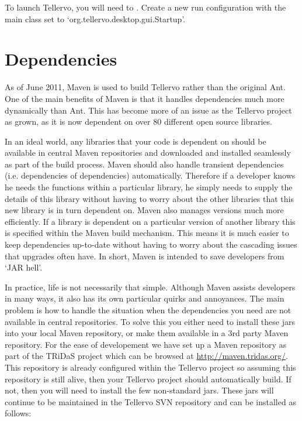 To launch Tellervo, you will need to .  Create a new run configuration with the main class set to `org.tellervo.desktop.gui.Startup'.     


\section{Dependencies}
\label{txt:DependenciesDesktopClient}
As of June 2011, Maven is used to build Tellervo rather than the original Ant.  One of the main benefits of Maven is that it handles dependencies much more dynamically than Ant.  This has become more of an issue as the Tellervo project as grown, as it is now dependent on over 80 different open source libraries.  

In an ideal world, any libraries that your code is dependent on should be available in central Maven repositories and downloaded and installed seamlessly as part of the build process.  Maven should also handle transient dependencies (i.e. dependencies of dependencies) automatically.  Therefore if a developer knows he needs the functions within a particular library, he simply needs to supply the details of this library without having to worry about the other libraries that this new library is in turn dependent on.  Maven also manages versions much more efficiently.  If a library is dependent on a particular version of another library this is specified within the Maven build mechanism.  This means it is much easier to keep dependencies up-to-date without having to worry about the cascading issues that upgrades often have.  In short, Maven is intended to save developers from `JAR hell'.

In practice, life is not necessarily that simple.  Although Maven assists developers in many ways, it also has its own particular quirks and annoyances.  The main problem is how to handle the situation when the dependencies you need are not available in central repositories.  To solve this you either need to install these jars into your local Maven repository, or make them available in a 3rd party Maven repository.  For the ease of developement we have set up a Maven repository as part of the TRiDaS project which can be browsed at \url{http://maven.tridas.org/}.  This repository is already configured within the Tellervo project so assuming this repository is still alive, then your Tellervo project should automatically build.  If not, then you will need to install the few non-standard jars.  These jars will continue to be maintained in the Tellervo SVN repository and can be installed as follows:

